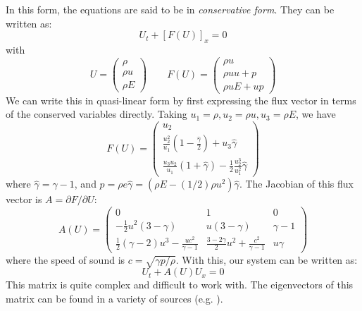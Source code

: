 In this form, the equations are said to be in {\em conservative form}.  They
can be written as:
\begin{equation}
U_t + \left [F(U) \right ]_x = 0
\end{equation}
with
\begin{equation}
U = \left ( \begin{array}{c} \rho \\ \rho u \\ \rho E \end{array} \right )
%
\qquad
%
F(U) = \left ( \begin{array}{c} \rho u \\ \rho uu + p \\ \rho u E + up \end{array} \right )
\end{equation}
%
We can write this in quasi-linear form by first expressing the flux
vector in terms of the conserved variables directly.  Taking $u_1 =
\rho, u_2 = \rho u, u_3 = \rho E$, we have
\begin{equation}
F(U) = \left ( \begin{array}{c} 
      u_2 \\
      \frac{u_2^2}{u_1} \left (1 - \frac{\hat{\gamma}}{2} \right ) + u_3 \hat{\gamma} \\
      \frac{u_3 u_2}{u_1}(1 + \hat{\gamma}) - \frac{1}{2} \frac{u_2^3}{u_1^2} \hat{\gamma} \end{array} \right )
\end{equation}
where $\hat{\gamma} = \gamma - 1$, and $p = \rho e \hat{\gamma} = (\rho E - (1/2) \rho u^2)\hat{\gamma}$.  The Jacobian of this flux vector is $A = \partial F/\partial U$:
\begin{equation}
A(U) = \left ( \begin{array}{ccc} 
   0  & 1 & 0 \\
   -\frac{1}{2}u^2(3 -\gamma) & u (3 -\gamma) & \gamma - 1 \\
   \frac{1}{2}(\gamma -2)u^3 - \frac{uc^2}{\gamma -1} &
       \frac{3-2\gamma}{2} u^2 + \frac{c^2}{\gamma -1} & u \gamma
  \end{array} \right )
\end{equation}
where the speed of sound is $c = \sqrt{\gamma p/\rho}$.   With this, our
system can be written as:
\begin{equation}
U_t + A(U) U_x = 0
\end{equation}
This matrix is quite complex and difficult to work with.  The eigenvectors
of this matrix can be found in a variety of sources (e.g. \cite{toro:1997,athena}).


